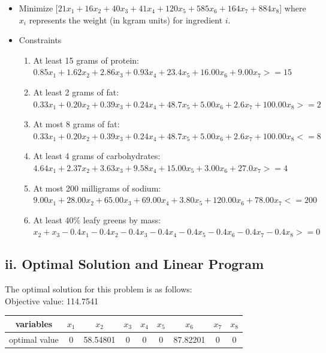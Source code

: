 \documentclass[11pt]{scrreprt}
\begin{document}
\begin{itemize}
	\item Minimize
[$21x_{1}+16x_{2}+40x_{3}+41x_{4}+120x_{5}+585x_{6}+164x_{7}+884x_{8}$]
where $x_{i}$ represents the weight (in kgram units) for ingredient $i$.
	\item Constraints
	\begin{enumerate}
		\item At least 15 grams of protein:\\
		$0.85x_{1}+1.62x_{2}+2.86x_{3}+0.93x_{4}+23.4x_{5}+16.00x_{6}+9.00x_{7} >= 15$
		\item At least 2 grams of fat:\\
		$0.33x_{1}+0.20x_{2}+0.39x_{3}+0.24x_{4}+48.7x_{5}+5.00x_{6}+2.6x_{7}+100.00x_{8} >= 2$
		\item At most 8 grams of fat:\\
		$0.33x_{1}+0.20x_{2}+0.39x_{3}+0.24x_{4}+48.7x_{5}+5.00x_{6}+2.6x_{7}+100.00x_{8} <= 8$
		\item At least 4 grams of carbohydrates:\\
		$4.64x_{1}+2.37x_{2}+3.63x_{3}+9.58x_{4}+15.00x_{5}+3.00x_{6}+27.0x_{7} >= 4$
		\item At most 200 milligrams of sodium:\\
		$9.00x_{1}+28.00x_{2}+65.00x_{3}+69.00x_{4}+3.80x_{5}+120.00x_{6}+78.00x_{7} <= 200$
		\item At least 40\% leafy greens by mass:\\
		$x_{2}+x_{3}-0.4x_{1}-0.4x_{2}-0.4x_{3}-0.4x_{4}-0.4x_{5}-0.4x_{6}-0.4x_{7}-0.4x_{8} >= 0$
	\end{enumerate}
\end{itemize}

\subsection{ii. Optimal Solution and Linear Program}

The optimal solution for this problem is as follows:\\

Objective value: 114.7541\\

\begin{tabular}{|c|c|c|c|c|c|c|c|c|}
	\hline variables & $x_{1}$ & $x_{2}$ & $x_{3}$ & $x_{4}$ & $x_{5}$ & $x_{6}$ & $x_{7}$ & $x_{8}$ \\
	\hline optimal value & 0 & 58.54801 & 0 & 0 & 0 & 87.82201 & 0 & 0 \\
	\hline
\end{tabular} \\
\end{document}
